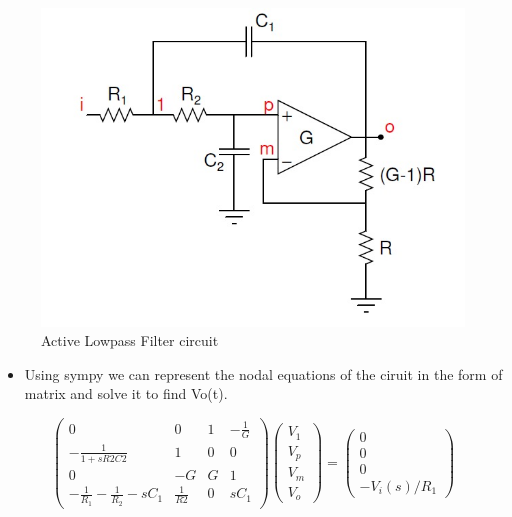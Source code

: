 \documentclass[11pt, a4paper]{article}
\begin{document}
\begin{figure}[!tbh]
  \centering
  \includegraphics[scale=0.5]{./../Extras/circuit1.jpeg}  %
      \caption{Active Lowpass Filter circuit}
\end{figure}

\begin{itemize}
\item
  Using sympy we can represent the nodal equations of the ciruit in the
  form of matrix and solve it to find Vo(t).
\end{itemize}

\[\begin{pmatrix} 0 & 0 & 1 & -\frac{1}{G} \\ -\frac{1}{1+sR2C2} & 1 & 0 & 0 \\ 0 & -G & G & 1 \\ -\frac{1}{R_1}-\frac{1}{R_2}-sC_1 & \frac{1}{R2} & 0 & sC_1 \end{pmatrix}\begin{pmatrix} V_1 \\ V_p \\ V_m \\ V_o \end{pmatrix} = \begin{pmatrix} 0 \\ 0 \\ 0 \\ -V_i(s)/R_1 \end{pmatrix}\]
\end{document}
